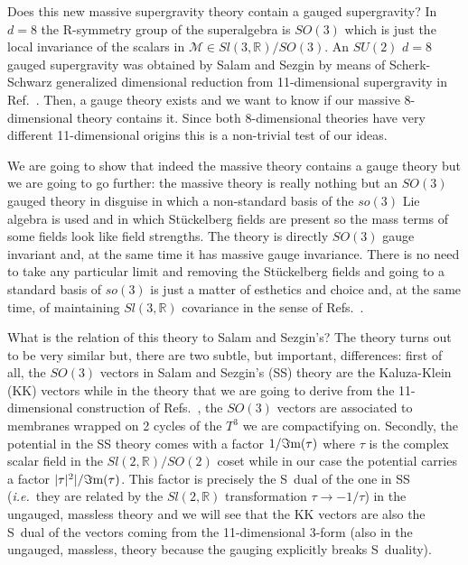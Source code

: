 \documentclass[12pt,a4paper]{article}
\begin{document}
Does this new massive supergravity theory contain a gauged
supergravity?  In $d=8$ the R-symmetry group of the superalgebra is
$SO(3)$ which is just the local invariance of the scalars in
$\mathcal{M}\in Sl(3,\mathbb{R})/SO(3)$. An $SU(2)$ $d=8$ gauged
supergravity was obtained by Salam and Sezgin by means of
Scherk-Schwarz generalized dimensional reduction \cite{kn:SS} from
11-dimensional supergravity in Ref.~\cite{kn:SS}. Then, a gauge theory
exists and we want to know if our massive 8-dimensional theory
contains it. Since both 8-dimensional theories have very different
11-dimensional origins this is a non-trivial test of our ideas.

We are going to show that indeed the massive theory contains a gauge
theory but we are going to go further: the massive theory is really
nothing but an $SO(3)$ gauged theory in disguise in which a
non-standard basis of the $so(3)$ Lie algebra is used and in which
St\"uckelberg fields are present so the mass terms of some fields look
like field strengths. The theory is directly $SO(3)$ gauge invariant
and, at the same time it has massive gauge invariance. There is no
need to take any particular limit and removing the St\"uckelberg
fields and going to a standard basis of $so(3)$ is just a matter of
esthetics and choice and, at the same time, of maintaining
$Sl(3,\mathbb{R})$ covariance in the sense of
Refs.~\cite{kn:MO,kn:KM}.

What is the relation of this theory to Salam and Sezgin's? The theory
turns out to be very similar but, there are two subtle, but important,
differences: first of all, the $SO(3)$ vectors in Salam and Sezgin's
(SS) theory are the Kaluza-Klein (KK) vectors while in the theory that
we are going to derive from the 11-dimensional construction of
Refs.~\cite{kn:BLO,kn:MO}, the $SO(3)$ vectors are associated to
membranes wrapped on 2 cycles of the $T^{3}$ we are compactifying on.
Secondly, the potential in the SS theory comes with a factor
$1/\Im{\rm m}(\tau)$ where $\tau$ is the complex scalar field in the
$Sl(2,\mathbb{R})/SO(2)$ coset while in our case the potential carries
a factor $|\tau|^{2}|/\Im{\rm m}(\tau)$. This factor is precisely the
S~dual of the one in SS ({\em i.e.}~they are related by the
$Sl(2,\mathbb{R})$ transformation $\tau\rightarrow -1/\tau$) in the
ungauged, massless theory and we will see that the KK vectors are also
the S~dual of the vectors coming from the 11-dimensional 3-form (also
in the ungauged, massless, theory because the gauging explicitly
breaks S~duality).
\end{document}
